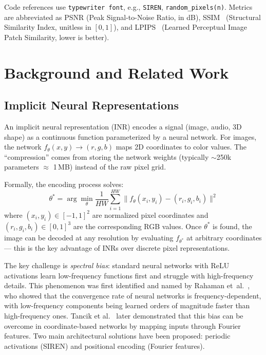 \documentclass[a4paper,oneside,11pt,english]{scrartcl}
\begin{document}
Code references use \texttt{typewriter font}, e.g., \texttt{SIREN},
\texttt{random\_pixels(n)}.  Metrics are abbreviated as PSNR (Peak
Signal-to-Noise Ratio, in dB), SSIM~\cite{wang2004ssim} (Structural
Similarity Index, unitless in $[0,1]$), and
LPIPS~\cite{zhang2018lpips} (Learned Perceptual Image Patch Similarity,
lower is better).

\section{Background and Related Work}
\label{sec:background}

\subsection{Implicit Neural Representations}

An implicit neural representation (INR) encodes a signal (image, audio, 3D
shape) as a continuous function parameterized by a neural network.  For images,
the network $f_\theta(x,y) \to (r,g,b)$ maps 2D coordinates to color values.
The ``compression'' comes from storing the network weights (typically
$\sim$250k parameters $\approx$ 1\,MB) instead of the raw pixel grid.

Formally, the encoding process solves:
\begin{equation}
    \theta^* = \arg\min_\theta \frac{1}{HW} \sum_{i=1}^{HW}
    \bigl\| f_\theta(x_i, y_i) - (r_i, g_i, b_i) \bigr\|^2
\end{equation}
where $(x_i, y_i) \in [-1, 1]^2$ are normalized pixel coordinates and
$(r_i, g_i, b_i) \in [0, 1]^3$ are the corresponding RGB values.  Once
$\theta^*$ is found, the image can be decoded at any resolution by evaluating
$f_{\theta^*}$ at arbitrary coordinates --- this is the key advantage of INRs
over discrete pixel representations.

The key challenge is \emph{spectral bias}: standard neural networks with ReLU
activations learn low-frequency functions first and struggle with
high-frequency details.  This phenomenon was first identified and named by
Rahaman et~al.~\cite{rahaman2019spectral}, who showed that the convergence
rate of neural networks is frequency-dependent, with low-frequency components
being learned orders of magnitude faster than high-frequency ones.  Tancik
et al.~\cite{tancik2020fourier} later demonstrated that this bias can be
overcome in coordinate-based networks by mapping inputs through Fourier
features.  Two main architectural solutions have been proposed: periodic
activations (SIREN) and positional encoding (Fourier features).
\end{document}
